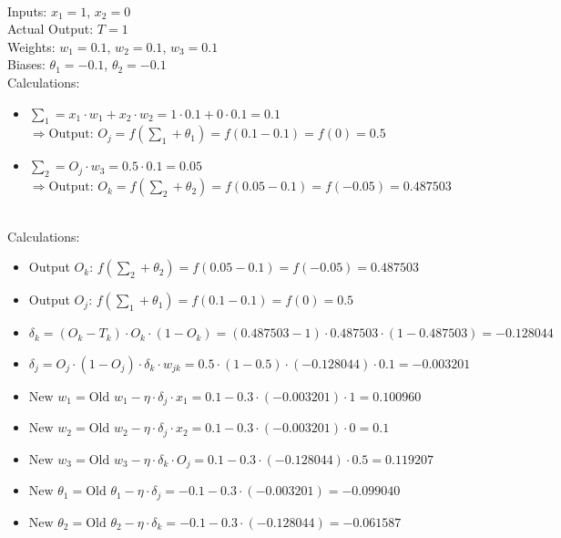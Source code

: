 \documentclass{book}
\begin{document}
\\
Inputs: \(x_1 = 1\), \(x_2 = 0\)\\
Actual Output: \(T = 1\)\\
Weights: \(w_1 = 0.1\), \(w_2 = 0.1\), \(w_3 = 0.1\)\\
Biases: \(\theta_1 = -0.1\), \(\theta_2 = -0.1\)\\
Calculations:
\begin{itemize}
    \item \(\sum_1 = x_1 \cdot w_1 + x_2 \cdot w_2 = 1 \cdot 0.1 + 0 \cdot 0.1 = 0.1\)\\
    \(\Rightarrow \text{Output: }O_j = f(\sum_1 + \theta_1) = f(0.1 - 0.1) = f(0) = 0.5\)
    \item \(\sum_2 = O_j \cdot w_3 = 0.5 \cdot 0.1 = 0.05\)\\
    \(\Rightarrow \text{Output: }O_k = f(\sum_2 + \theta_2) = f(0.05 - 0.1) = f(-0.05) = 0.487503\)
\end{itemize}
\\
Calculations:
\begin{itemize}
    \item Output \(O_k\): \(f(\sum_2 + \theta_2) = f(0.05 - 0.1) = f(-0.05) = 0.487503\)
    \item Output \(O_j\): \(f(\sum_1 + \theta_1) = f(0.1 - 0.1) = f(0) = 0.5\)
    \item \(\delta_k = (O_k - T_k) \cdot O_k \cdot (1 - O_k) = (0.487503 - 1) \cdot 0.487503 \cdot (1 - 0.487503) = -0.128044\)
    \item \(\delta_j = O_j \cdot (1 - O_j) \cdot \delta_k \cdot w_{jk} = 0.5 \cdot (1 - 0.5) \cdot (-0.128044) \cdot 0.1 = -0.003201\)
    \item \(\text{New } w_1 = \text{Old } w_1 - \eta \cdot \delta_j \cdot x_1 = 0.1 - 0.3 \cdot (-0.003201) \cdot 1 = 0.100960\)
    \item \(\text{New } w_2 = \text{Old } w_2 - \eta \cdot \delta_j \cdot x_2 = 0.1 - 0.3 \cdot (-0.003201) \cdot 0 = 0.1\)
    \item \(\text{New } w_3 = \text{Old } w_3 - \eta \cdot \delta_k \cdot O_j = 0.1 - 0.3 \cdot (-0.128044) \cdot 0.5 = 0.119207\)
    \item \(\text{New } \theta_1 = \text{Old } \theta_1 - \eta \cdot \delta_j = -0.1 - 0.3 \cdot (-0.003201) = -0.099040\)
    \item \(\text{New } \theta_2 = \text{Old } \theta_2 - \eta \cdot \delta_k = -0.1 - 0.3 \cdot (-0.128044) = -0.061587\)
\end{itemize}
\end{document}
